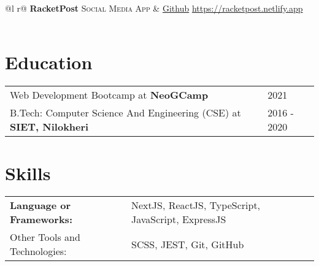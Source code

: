 \documentclass[a4paper,12pt]{article}
\begin{document}
\begin{tabularx}{\linewidth}{ @{}l r@{} }
\textbf{RacketPost} \textsc{Social Media App} &  \href{https://github.com/AnkitKarnAK/racketpost-social-media-app}{Github}  \hfill \href{https://racketpost.netlify.app}{https://racketpost.netlify.app} \\[3.75pt]
  \\
\end{tabularx}

\section{Education}
\begin{tabularx}{\linewidth}{@{}l X@{}}	
Web Development Bootcamp at \textbf{NeoGCamp} & \hfill 2021 \\
B.Tech: 
Computer Science And 
Engineering (CSE) at \textbf{SIET, Nilokheri} & \hfill 2016 - 2020 \\ 
\end{tabularx}


\section{Skills}
\begin{tabularx}{\linewidth}{@{}l X@{}}
\textbf{Language or Frameworks:} &  \normalsize{NextJS, ReactJS, TypeScript, JavaScript, ExpressJS}\\
Other Tools and Technologies:  &  \normalsize{SCSS, JEST, Git, GitHub}\\  
\end{tabularx}

\vfill
{}
\end{document}
